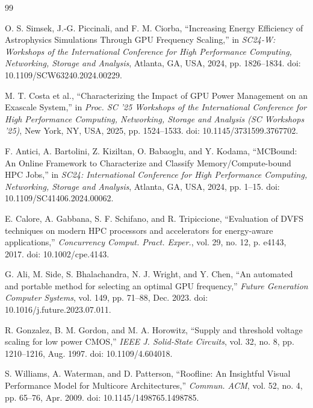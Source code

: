 \documentclass[12pt,oneside,spanish]{book}
\begin{document}

\begin{sloppypar}
\begin{thebibliography}{99}

 O. S. Simsek, J.-G. Piccinali, and F. M. Ciorba, ``Increasing Energy Efficiency of Astrophysics Simulations Through GPU Frequency Scaling,'' in \textit{SC24-W: Workshops of the International Conference for High Performance Computing, Networking, Storage and Analysis}, Atlanta, GA, USA, 2024, pp. 1826--1834. doi: 10.1109/SCW63240.2024.00229.

 M. T. Costa et al., ``Characterizing the Impact of GPU Power Management on an Exascale System,'' in \textit{Proc. SC '25 Workshops of the International Conference for High Performance Computing, Networking, Storage and Analysis (SC Workshops '25)}, New York, NY, USA, 2025, pp. 1524--1533. doi: 10.1145/3731599.3767702.

 F. Antici, A. Bartolini, Z. Kiziltan, O. Babaoglu, and Y. Kodama, ``MCBound: An Online Framework to Characterize and Classify Memory/Compute-bound HPC Jobs,'' in \textit{SC24: International Conference for High Performance Computing, Networking, Storage and Analysis}, Atlanta, GA, USA, 2024, pp. 1--15. doi: 10.1109/SC41406.2024.00062.

 E. Calore, A. Gabbana, S. F. Schifano, and R. Tripiccione, ``Evaluation of DVFS techniques on modern HPC processors and accelerators for energy-aware applications,'' \textit{Concurrency Comput. Pract. Exper.}, vol. 29, no. 12, p. e4143, 2017. doi: 10.1002/cpe.4143.

 G. Ali, M. Side, S. Bhalachandra, N. J. Wright, and Y. Chen, ``An automated and portable method for selecting an optimal GPU frequency,'' \textit{Future Generation Computer Systems}, vol. 149, pp. 71--88, Dec. 2023. doi: 10.1016/j.future.2023.07.011.

 R. Gonzalez, B. M. Gordon, and M. A. Horowitz, ``Supply and threshold voltage scaling for low power CMOS,'' \textit{IEEE J. Solid-State Circuits}, vol. 32, no. 8, pp. 1210--1216, Aug. 1997. doi: 10.1109/4.604018.

 S. Williams, A. Waterman, and D. Patterson, ``Roofline: An Insightful Visual Performance Model for Multicore Architectures,'' \textit{Commun. ACM}, vol. 52, no. 4, pp. 65--76, Apr. 2009. doi: 10.1145/1498765.1498785.


\end{thebibliography}
\end{sloppypar}
\end{document}

